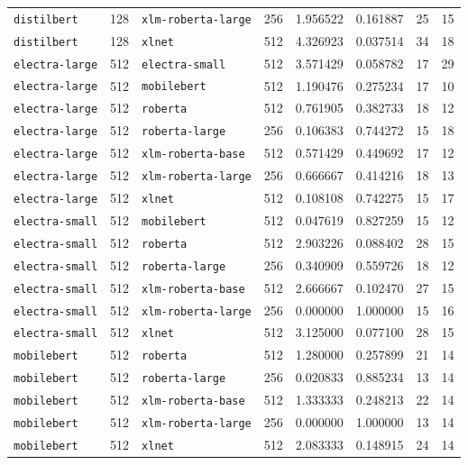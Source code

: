 \documentclass[11pt]{article}
\begin{document}
\begin{landscape}
\begin{longtable}{llllcccc}
\texttt{distilbert} & 128 & \texttt{xlm-roberta-large} & 256 & 1.956522 & 0.161887 & 25 & 15 \\
\texttt{distilbert} & 128 & \texttt{xlnet} & 512 & 4.326923 & 0.037514 & 34 & 18 \\
\texttt{electra-large} & 512 & \texttt{electra-small} & 512 & 3.571429 & 0.058782 & 17 & 29 \\
\texttt{electra-large} & 512 & \texttt{mobilebert} & 512 & 1.190476 & 0.275234 & 17 & 10 \\
\texttt{electra-large} & 512 & \texttt{roberta} & 512 & 0.761905 & 0.382733 & 18 & 12 \\
\texttt{electra-large} & 512 & \texttt{roberta-large} & 256 & 0.106383 & 0.744272 & 15 & 18 \\
\texttt{electra-large} & 512 & \texttt{xlm-roberta-base} & 512 & 0.571429 & 0.449692 & 17 & 12 \\
\texttt{electra-large} & 512 & \texttt{xlm-roberta-large} & 256 & 0.666667 & 0.414216 & 18 & 13 \\
\texttt{electra-large} & 512 & \texttt{xlnet} & 512 & 0.108108 & 0.742275 & 15 & 17 \\
\texttt{electra-small} & 512 & \texttt{mobilebert} & 512 & 0.047619 & 0.827259 & 15 & 12 \\
\texttt{electra-small} & 512 & \texttt{roberta} & 512 & 2.903226 & 0.088402 & 28 & 15 \\
\texttt{electra-small} & 512 & \texttt{roberta-large} & 256 & 0.340909 & 0.559726 & 18 & 12 \\
\texttt{electra-small} & 512 & \texttt{xlm-roberta-base} & 512 & 2.666667 & 0.102470 & 27 & 15 \\
\texttt{electra-small} & 512 & \texttt{xlm-roberta-large} & 256 & 0.000000 & 1.000000 & 15 & 16 \\
\texttt{electra-small} & 512 & \texttt{xlnet} & 512 & 3.125000 & 0.077100 & 28 & 15 \\
\texttt{mobilebert} & 512 & \texttt{roberta} & 512 & 1.280000 & 0.257899 & 21 & 14 \\
\texttt{mobilebert} & 512 & \texttt{roberta-large} & 256 & 0.020833 & 0.885234 & 13 & 14 \\
\texttt{mobilebert} & 512 & \texttt{xlm-roberta-base} & 512 & 1.333333 & 0.248213 & 22 & 14 \\
\texttt{mobilebert} & 512 & \texttt{xlm-roberta-large} & 256 & 0.000000 & 1.000000 & 13 & 14 \\
\texttt{mobilebert} & 512 & \texttt{xlnet} & 512 & 2.083333 & 0.148915 & 24 & 14 \\

\end{longtable}
\end{landscape}
\end{document}

